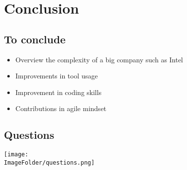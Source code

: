 %
%

\section{Conclusion}

\subsection{To conclude}
\begin{FrameWithSubSection}
    \begin{itemize}
            \item Overview the complexity of a big company such as Intel
            \item Improvements in tool usage
            \item Improvement in coding skills
            \item Contributions in agile mindset
    \end{itemize}
\end{FrameWithSubSection}

\subsection{Questions}
\begin{FrameWithSubSection}
    \center
  \texttt{[image: \\ImageFolder/questions.png]}
\end{FrameWithSubSection}

